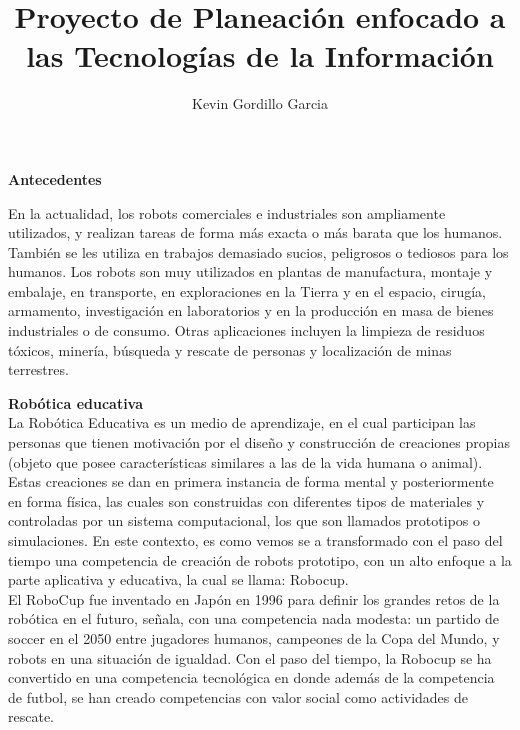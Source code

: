 \documentclass[letterpaper ,10pt]{article}
\title{ Proyecto de Planeación enfocado a las Tecnologías de la Información }
\author{Kevin Gordillo Garcia}
\begin{document}
{\par}
{ \par}
{ \par}
{ \par}
{ \par}

\newpage

\centerline {\Huge\sffamily\textbf{ Antecedentes  }}

\noindent En la actualidad, los robots comerciales e industriales son ampliamente utilizados, y realizan tareas de forma más exacta o más barata que los humanos. También se les utiliza en trabajos demasiado sucios, peligrosos o tediosos para los humanos. Los robots son muy utilizados en plantas de manufactura, montaje y embalaje, en transporte, en exploraciones en la Tierra y en el espacio, cirugía, armamento, investigación en laboratorios y en la producción en masa de bienes industriales o de consumo. Otras aplicaciones incluyen la limpieza de residuos tóxicos, minería, búsqueda y rescate de personas y localización de minas terrestres.

\vspace{0.5cm}

{\LARGE \textbf{ Robótica educativa}}
\vspace{0.2cm}
\\
La Robótica Educativa es un medio de aprendizaje, en el cual participan las personas que tienen motivación por el diseño y construcción de creaciones propias (objeto que posee características similares a las de la vida humana o animal). Estas creaciones se dan en primera instancia de forma mental y posteriormente en forma física, las cuales son construidas con diferentes tipos de materiales y controladas por un sistema computacional, los que son llamados prototipos o simulaciones. En este contexto, es como vemos se a transformado con el paso del tiempo una competencia de creación de robots prototipo, con un alto enfoque a la parte aplicativa y educativa, la cual se llama: Robocup.\\
\medskip
El RoboCup fue inventado en Japón en 1996 para definir  los grandes retos de la robótica en el futuro, señala, con una competencia nada modesta: un partido de soccer en el 2050 entre jugadores humanos, campeones de la Copa del Mundo, y robots en una situación de igualdad. Con el paso del tiempo, la Robocup se ha convertido en una competencia tecnológica en donde además de la competencia de futbol, se han creado competencias con valor social como actividades de rescate.
\end{document}
